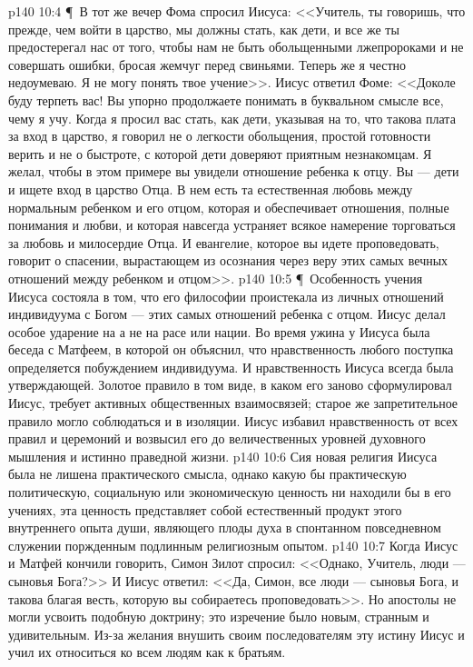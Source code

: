 \vs p140 10:4 \P\ В тот же вечер Фома спросил Иисуса: <<Учитель, ты говоришь, что прежде, чем войти в царство, мы должны стать, как дети, и все же ты предостерегал нас от того, чтобы нам не быть обольщенными лжепророками и не совершать ошибки, бросая жемчуг перед свиньями. Теперь же я честно недоумеваю. Я не могу понять твое учение>>. Иисус ответил Фоме: <<Доколе буду терпеть вас! Вы упорно продолжаете понимать в буквальном смысле все, чему я учу. Когда я просил вас стать, как дети, указывая на то, что такова плата за вход в царство, я говорил не о легкости обольщения, простой готовности верить и не о быстроте, с которой дети доверяют приятным незнакомцам. Я желал, чтобы в этом примере вы увидели отношение ребенка к отцу. Вы --- дети и ищете вход в царство  Отца. В нем есть та естественная любовь между нормальным ребенком и его отцом, которая и обеспечивает отношения, полные понимания и любви, и которая навсегда устраняет всякое намерение торговаться за любовь и милосердие Отца. И евангелие, которое вы идете проповедовать, говорит о спасении, вырастающем из осознания через веру этих самых вечных отношений между ребенком и отцом>>.
\vs p140 10:5 \P\ Особенность учения Иисуса состояла в том, что  его философии проистекала из личных отношений индивидуума с Богом --- этих самых отношений ребенка с отцом. Иисус делал особое ударение на  а не на расе или нации. Во время ужина у Иисуса была беседа с Матфеем, в которой он объяснил, что нравственность любого поступка определяется побуждением индивидуума. И нравственность Иисуса всегда была утверждающей. Золотое правило в том виде, в каком его заново сформулировал Иисус, требует активных общественных взаимосвязей; старое же запретительное правило могло соблюдаться и в изоляции. Иисус избавил нравственность от всех правил и церемоний и возвысил его до величественных уровней духовного мышления и истинно праведной жизни.
\vs p140 10:6 Сия новая религия Иисуса была не лишена практического смысла, однако какую бы практическую политическую, социальную или экономическую ценность ни находили бы в его учениях, эта ценность представляет собой естественный продукт этого внутреннего опыта души, являющего плоды духа в спонтанном повседневном служении поржденным подлинным религиозным опытом.
\vs p140 10:7 Когда Иисус и Матфей кончили говорить, Симон Зилот спросил: <<Однако, Учитель,  люди --- сыновья Бога?>> И Иисус ответил: <<Да, Симон, все люди --- сыновья Бога, и такова благая весть, которую вы собираетесь проповедовать>>. Но апостолы не могли усвоить подобную доктрину; это изречение было новым, странным и удивительным. Из\hyp{}за желания внушить своим последователям эту истину Иисус и учил их относиться ко всем людям как к братьям.
